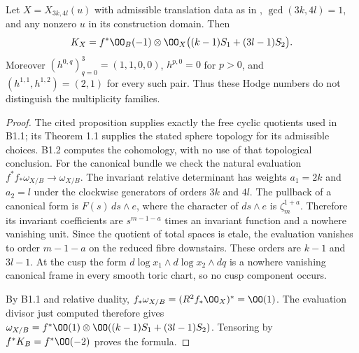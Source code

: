 \begin{proposition}\label{inv:B2.1}
Let $X=X_{3k,4l}(u)$ with admissible translation data as in
\citet[Theorem 1.1 and Proposition 2.3]{ViaclovskyLog2026},
$\gcd(3k,4l)=1$, and any nonzero $u$ in its construction domain.
Then
\[
K_X=f^*\OO_B(-1)\otimes
\OO_X\bigl((k-1)S_1+(3l-1)S_2\bigr).
\]
Moreover $(h^{0,q})_{q=0}^3=(1,1,0,0)$, $h^{p,0}=0$ for $p>0$,
and $(h^{1,1},h^{1,2})=(2,1)$ for every such pair.
Thus these Hodge numbers do not distinguish the multiplicity families.
\end{proposition}
\begin{proof}
The cited proposition supplies exactly the free cyclic quotients used
in B1.1; its Theorem 1.1 supplies the stated sphere topology for its
admissible choices. B1.2 computes the cohomology, with no use of that
topological conclusion.
For the canonical bundle we check the natural evaluation
$f^*f_*\omega_{X/B}\to\omega_{X/B}$.
The invariant relative determinant has weights $a_1=2k$ and $a_2=l$
under the clockwise generators of orders $3k$ and $4l$. The pullback
of a canonical form is $F(s)\,ds\wedge e$, where the character of
$ds\wedge e$ is $\zeta_m^{1+a}$. Therefore its invariant coefficients
are $s^{m-1-a}$ times an invariant function and a nowhere vanishing
unit. Since the quotient of total spaces is etale, the evaluation
vanishes to order $m-1-a$ on the reduced fibre downstairs. These orders
are $k-1$ and $3l-1$. At the cusp the form
$d\log x_1\wedge d\log x_2\wedge dq$ is a nowhere vanishing canonical
frame in every smooth toric chart, so no cusp component occurs.

By B1.1 and relative duality,
$f_*\omega_{X/B}=(R^2f_*\OO_X)^*=\OO(1)$.
The evaluation divisor just computed therefore gives
$\omega_{X/B}=f^*\OO(1)\otimes
\OO((k-1)S_1+(3l-1)S_2)$. Tensoring by $f^*K_B=f^*\OO(-2)$
proves the formula.
\end{proof}

